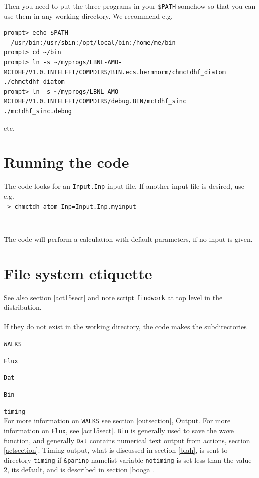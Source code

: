 \documentclass[10pt,leqno, oneside]{book}
\begin{document}
Then you need to put the three programs in your \verb#$PATH# somehow so that you can use them in any working directory.  We recommend e.g.
{\footnotesize
\begin{verbatim}
prompt> echo $PATH
  /usr/bin:/usr/sbin:/opt/local/bin:/home/me/bin
prompt> cd ~/bin
prompt> ln -s ~/myprogs/LBNL-AMO-MCTDHF/V1.0.INTELFFT/COMPDIRS/BIN.ecs.hermnorm/chmctdhf_diatom ./chmctdhf_diatom
prompt> ln -s ~/myprogs/LBNL-AMO-MCTDHF/V1.0.INTELFFT/COMPDIRS/debug.BIN/mctdhf_sinc ./mctdhf_sinc.debug
\end{verbatim}}
etc.

\section{Running the code}

The code looks for an \verb#Input.Inp# input file.  If another input file is desired, use e.g. \\
\verb# > chmctdh_atom Inp=Input.Inp.myinput#

\

The code will perform a calculation with default parameters, if no input is given.

\section{File system etiquette\label{etsection}}

See also section \ref{act15sect} and note script \verb#findwork# at top level in the distribution.
\ \\ 
\ \\
If they do not exist in the working directory, the code makes the subdirectories 

\verb#WALKS#

\verb#Flux#

\verb#Dat#

\verb#Bin#

\verb#timing# \\
For more information on \verb#WALKS# see section \ref{outsection}, Output.  For more information on
\verb#Flux#, see  \ref{act15sect}.  \verb#Bin# is generally used to save the wave function, and generally \verb#Dat# contains
numerical text output from actions, section \ref{actsection}.  Timing output, what is discussed in section \ref{blah},
 is sent to directory \verb#timing# if \verb#&parinp# namelist variable \verb#notiming# is set less than the value 2,
 its default, and is described in section \ref{booga}.
 
\end{document}
